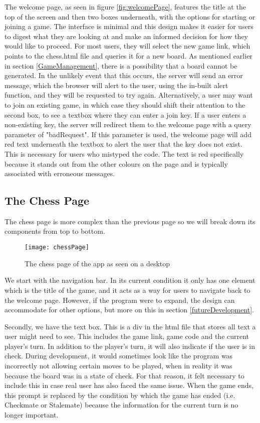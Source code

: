 The welcome page, as seen in figure \ref{fig:welcomePage}, features the title at the top of the screen and then two boxes underneath, with the options for starting or joining a game. The interface is minimal and this design makes it easier for users to digest what they are looking at and make an informed decision for how they would like to proceed. For most users, they will select the new game link, which points to the chess.html file and queries it for a new board. As mentioned earlier in section \ref{GameManagement}, there is a possibility that a board cannot be generated. In the unlikely event that this occurs, the server will send an error message, which the browser will alert to the user, using the in-built alert function, and they will be requested to try again. Alternatively, a user may want to join an existing game, in which case they should shift their attention to the second box, to see a textbox where they can enter a join key. If a user enters a non-existing key, the server will redirect them to the welcome page with a query parameter of "badRequest". If this parameter is used, the welcome page will add red text underneath the textbox to alert the user that the key does not exist. This is necessary for users who mistyped the code. The text is red specifically because it stands out from the other colours on the page and is typically associated with erroneous messages.

\subsection{The Chess Page}
\label{TheChessPage}

The chess page is more complex than the previous page so we will break down its components from top to bottom.

\begin{figure}
    \begin{center}
        \texttt{[image: chessPage]}
        \caption{The chess page of the app as seen on a desktop}
    \end{center}
\end{figure}

We start with the navigation bar. In its current condition it only has one element which is the title of the game, and it acts as a way for users to navigate back to the welcome page. However, if the program were to expand, the design can accommodate for other options, but more on this in section \ref{futureDevelopment}.

Secondly, we have the text box. This is a div in the html file that stores all text a user might need to see. This includes the game link, game code and the current player's turn. In addition to the player's turn, it will also indicate if the user is in check. During development, it would sometimes look like the program was incorrectly not allowing certain moves to be played, when in reality it was because the board was in a state of check. For that reason, it felt necessary to include this in case real user has also faced the same issue. When the game ends, this prompt is replaced by the condition by which the game has ended (i.e. Checkmate or Stalemate) because the information for the current turn is no longer important.

